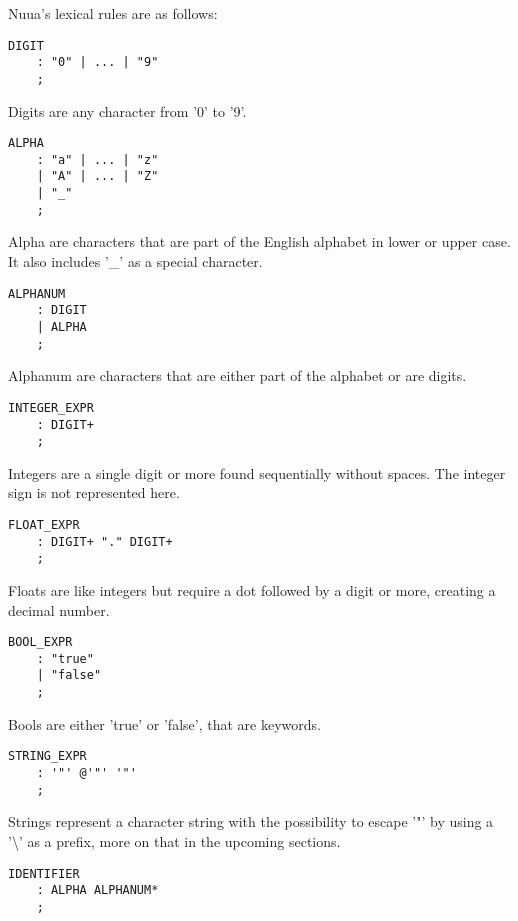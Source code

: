Nuua's lexical rules are as follows:

\begin{lstlisting}
DIGIT
    : "0" | ... | "9"
    ;
\end{lstlisting}

Digits are any character from '0' to '9'.

\begin{lstlisting}
ALPHA
    : "a" | ... | "z"
    | "A" | ... | "Z"
    | "_"
    ;
\end{lstlisting}

Alpha are characters that are part of the English alphabet in lower or upper case. It also includes '\_' as a special character.

\begin{lstlisting}
ALPHANUM
    : DIGIT
    | ALPHA
    ;
\end{lstlisting}

Alphanum are characters that are either part of the alphabet or are digits.

\begin{lstlisting}
INTEGER_EXPR
    : DIGIT+
    ;
\end{lstlisting}

Integers are a single digit or more found sequentially without spaces. The integer sign is not represented here.

\begin{lstlisting}
FLOAT_EXPR
    : DIGIT+ "." DIGIT+
    ;
\end{lstlisting}

Floats are like integers but require a dot followed by a digit or more, creating a decimal number.

\begin{lstlisting}
BOOL_EXPR
    : "true"
    | "false"
    ;
\end{lstlisting}

Bools are either 'true' or 'false', that are keywords.

\begin{lstlisting}
STRING_EXPR
    : '"' @'"' '"'
    ;
\end{lstlisting}

Strings represent a character string with the possibility to escape '"' by using a '\textbackslash' as a prefix, more on that in the upcoming sections.

\begin{lstlisting}
IDENTIFIER
    : ALPHA ALPHANUM*
    ;
\end{lstlisting}

